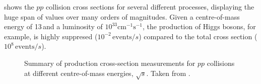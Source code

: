 
 shows the $pp$ collision cross sections for several different processes, displaying the huge span of values over many orders of magnitudes. 
Given a centre-of-mass energy of 13\,\TeV and a luminosity of $10^{33}\mathrm{cm^{-1}s^{-1}}$, the production of Higgs bosons, for example, is highly suppresed ($10^{-2}\,\text{events}/s$) compared to the total cross section ($10^8\,\text{events}/s$).

\begin{figure}
  \caption[Summary of production cross-sections measurements for $pp$ collisions at different centre-of-mass energy, $\sqrt{s}$.]{
    Summary of production cross-section measurements for $pp$ collisions at different centre-of-mass energies, $\sqrt{s}$. Taken from .
    }
  \label{fig:xsec}
\end{figure}


